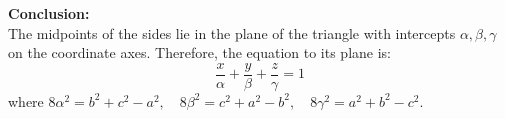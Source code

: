 \documentclass[11pt,a4paper]{article}
\begin{document}
\vspace{0.4cm}
\begin{resultbox}
\textbf{Conclusion:}\\
The midpoints of the sides lie in the plane of the triangle with intercepts $\alpha, \beta, \gamma$ on the coordinate axes. Therefore, the equation to its plane is:
$$\boxed{\frac{x}{\alpha} + \frac{y}{\beta} + \frac{z}{\gamma} = 1}$$
where $8\alpha^2 = b^2 + c^2 - a^2, \quad 8\beta^2 = c^2 + a^2 - b^2, \quad 8\gamma^2 = a^2 + b^2 - c^2$.
\end{resultbox}
\end{document}
